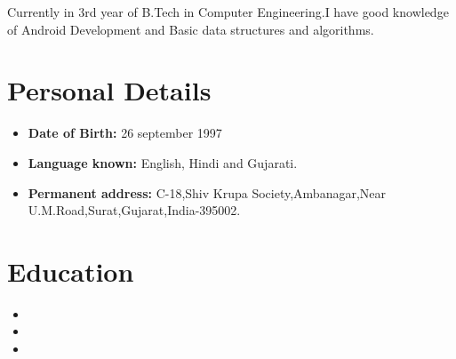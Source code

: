 \documentclass[11pt,a4paper,sans]{moderncv}        %
\begin{document}
\makecvtitle

\small{Currently in 3rd year of B.Tech in Computer Engineering.I have good knowledge of Android Development and Basic data structures and algorithms. }


\section{Personal Details}
\vspace{6pt}
\begin{itemize}
\item \textbf{Date of Birth: }26 september 1997\vspace{4pt}
\item \textbf{Language known: }English, Hindi and Gujarati\vspace{4pt}.
\item \textbf{Permanent address: }C-18,Shiv Krupa Society,Ambanagar,Near U.M.Road,Surat,Gujarat,India-395002.\vspace{6pt}
\end{itemize}



\section{Education}
\vspace{6pt}
\begin{itemize}
\item{}
\vspace{6pt}
\item{}
\vspace{6pt}
\item{}
\end{itemize}
\end{document}
